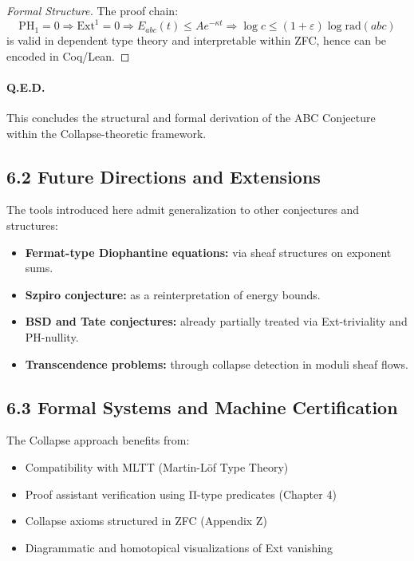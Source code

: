 \documentclass[11pt]{article}
\begin{document}
\begin{proof}[Formal Structure]
The proof chain:
\[
\mathrm{PH}_1 = 0 \Rightarrow \mathrm{Ext}^1 = 0 \Rightarrow E_{abc}(t) \leq A e^{-\kappa t} \Rightarrow \log c \leq (1+\varepsilon) \log \mathrm{rad}(abc)
\]
is valid in dependent type theory and interpretable within ZFC, hence can be encoded in Coq/Lean.
\end{proof}

\paragraph{Q.E.D.}  
This concludes the structural and formal derivation of the ABC Conjecture within the Collapse-theoretic framework.

\subsection{6.2 Future Directions and Extensions}

The tools introduced here admit generalization to other conjectures and structures:
\begin{itemize}
    \item \textbf{Fermat-type Diophantine equations:} via sheaf structures on exponent sums.
    \item \textbf{Szpiro conjecture:} as a reinterpretation of energy bounds.
    \item \textbf{BSD and Tate conjectures:} already partially treated via Ext-triviality and PH-nullity.
    \item \textbf{Transcendence problems:} through collapse detection in moduli sheaf flows.
\end{itemize}

\subsection{6.3 Formal Systems and Machine Certification}

The Collapse approach benefits from:
\begin{itemize}
    \item Compatibility with MLTT (Martin-Löf Type Theory)
    \item Proof assistant verification using Π-type predicates (Chapter 4)
    \item Collapse axioms structured in ZFC (Appendix Z)
    \item Diagrammatic and homotopical visualizations of Ext vanishing
\end{itemize}
\end{document}
